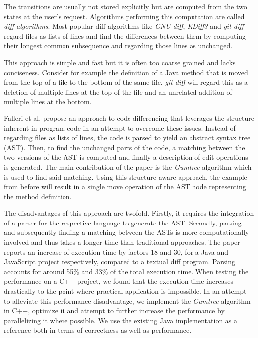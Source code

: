 \documentclass[letterpaper]{article}
\begin{document}
The transitions are usually not stored explicitly but are computed from the two states at the user's request.
Algorithms performing this computation are called \emph{diff algorithms}.
Most popular diff algorithms like \emph{GNU diff}, \emph{KDiff3} and \emph{git-diff} regard files as lists of lines and find the differences between them by computing their longest common subsequence and regarding those lines as unchanged.

This approach is simple and fast but it is often too coarse grained and lacks conciseness.
Consider for example the definition of a Java method that is moved from the top of a file to the bottom of the same file.
\emph{git-diff} will regard this as a deletion of multiple lines at the top of the file and an unrelated addition of multiple lines at the bottom.

Falleri et al. \cite{falleri:2014:structure_diff} propose an approach to code differencing that leverages the structure inherent in program code in an attempt to overcome these issues.
Instead of regarding files as lists of lines, the code is parsed to yield an abstract syntax tree (AST).
Then, to find the unchanged parts of the code, a matching between the two versions of the AST is computed and finally a description of edit operations is generated.
The main contribution of the paper is the \emph{Gumtree} algorithm which is used to find said matching.
Using this structure-aware approach, the example from before will result in a single move operation of the AST node representing the method definition.

The disadvantages of this approach are twofold.
Firstly, it requires the integration of a parser for the respective language to generate the AST.
Secondly, parsing and subsequently finding a matching between the ASTs is more computationally involved and thus takes a longer time than traditional approaches.
The paper reports an increase of execution time by factors 18 and 30, for a Java and JavaScript project respectively, compared to a textual diff program.
Parsing accounts for around 55\% and 33\% of the total execution time.
When testing the performance on a C++ project, we found that the execution time increases drastically to the point where practical application is impossible.
In an attempt to alleviate this performance disadvantage, we implement the \emph{Gumtree} algorithm in C++, optimize it and attempt to further increase the performance by parallelizing it where possible.
We use the existing Java implementation as a reference both in terms of correctness as well as performance.
\end{document}
